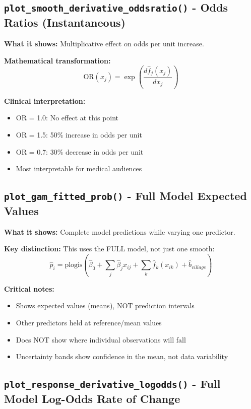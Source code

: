 \documentclass[12pt]{article}
\begin{document}
\subsection*{\texttt{plot\_smooth\_derivative\_oddsratio()} - Odds Ratios (Instantaneous)}

\textbf{What it shows:} Multiplicative effect on odds per unit increase.

\textbf{Mathematical transformation:}
$$\text{OR}(x_j) = \exp\left(\frac{d\hat{f}_j(x_j)}{dx_j}\right)$$

\textbf{Clinical interpretation:}
\begin{itemize}
   \item OR = 1.0: No effect at this point
   \item OR = 1.5: 50\% increase in odds per unit
   \item OR = 0.7: 30\% decrease in odds per unit
   \item Most interpretable for medical audiences
\end{itemize}

\subsection*{\texttt{plot\_gam\_fitted\_prob()} - Full Model Expected Values}

\textbf{What it shows:} Complete model predictions while varying one predictor.

\textbf{Key distinction:} This uses the FULL model, not just one smooth:
$$\hat{p}_i = \text{plogis}(\hat{\beta}_0 + \sum_j \hat{\beta}_j x_{ij} + \sum_k \hat{f}_k(x_{ik}) + \hat{b}_{village})$$

\textbf{Critical notes:}
\begin{itemize}
   \item Shows expected values (means), NOT prediction intervals
   \item Other predictors held at reference/mean values
   \item Does NOT show where individual observations will fall
   \item Uncertainty bands show confidence in the mean, not data variability
\end{itemize}

\subsection*{\texttt{plot\_response\_derivative\_logodds()} - Full Model Log-Odds Rate of Change}
\end{document}
